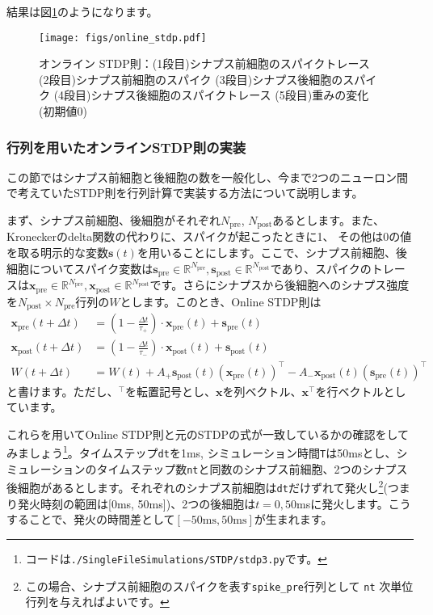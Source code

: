 結果は図\ref{fig:online_stdp}のようになります。
\begin{figure}[htbp]
    \centering
    \texttt{[image: figs/online\_stdp.pdf]}
    \caption{オンライン STDP則：(1段目)シナプス前細胞のスパイクトレース (2段目)シナプス前細胞のスパイク (3段目)シナプス後細胞のスパイク (4段目)シナプス後細胞のスパイクトレース (5段目)重みの変化(初期値0)}
    \label{fig:online_stdp}
\end{figure}
\subsubsection{行列を用いたオンラインSTDP則の実装}
この節ではシナプス前細胞と後細胞の数を一般化し、今まで2つのニューロン間で考えていたSTDP則を行列計算で実装する方法について説明します。\par
まず、シナプス前細胞、後細胞がそれぞれ$N_\text{pre}$, $N_\text{post}$あるとします。また、Kroneckerのdelta関数の代わりに、スパイクが起こったときに1、 その他は0の値を取る明示的な変数$\boldsymbol{s}(t)$を用いることにします。ここで、シナプス前細胞、後細胞についてスパイク変数は$\boldsymbol{s}_{\text{pre}} \in \mathbb{R}^{N_\text{pre}}, \boldsymbol{s}_{\text{post}} \in \mathbb{R}^{N_\text{post}}$であり、スパイクのトレースは$\boldsymbol{x}_{\text{pre}} \in \mathbb{R}^{N_\text{pre}}, \boldsymbol{x}_{\text{post}} \in \mathbb{R}^{N_\text{post}}$です。さらにシナプスから後細胞へのシナプス強度を$N_\text{post} \times N_\text{pre}$行列の$W$とします。このとき、Online STDP則は
\begin{align}
\boldsymbol{x}_{\text{pre}}(t+\Delta t)&=\left(1-\frac{\Delta t}{\tau_{+}}\right)\cdot \boldsymbol{x}_{\text{pre}}(t)+
\boldsymbol{s}_{\text{pre}}(t)\\
\boldsymbol{x}_{\text{post}}(t+\Delta t)&=\left(1-\frac{\Delta t}{\tau_{-}}\right)\cdot \boldsymbol{x}_{\text{post}}(t)+\boldsymbol{s}_{\text{post}}(t)\\
W(t+\Delta t)&=W(t)+A_+ \boldsymbol{s}_{\text{post}}(t)(\boldsymbol{x}_{\text{pre}}(t))^\intercal - A_-\boldsymbol{x}_{\text{post}}(t)(\boldsymbol{s}_{\text{pre}}(t))^\intercal
\end{align}
と書けます。ただし、$^\intercal$を転置記号とし、$\boldsymbol{x}$を列ベクトル、$\boldsymbol{x}^\intercal$を行ベクトルとしています。\par
これらを用いてOnline STDP則と元のSTDPの式が一致しているかの確認をしてみましょう\footnote{コードは\texttt{./SingleFileSimulations/STDP/stdp3.py}です。}。タイムステップ\texttt{dt}を1ms, シミュレーション時間\texttt{T}は50msとし、シミュレーションのタイムステップ数\texttt{nt}と同数のシナプス前細胞、2つのシナプス後細胞があるとします。それぞれのシナプス前細胞は\texttt{dt}だけずれて発火し\footnote{この場合、シナプス前細胞のスパイクを表す\texttt{spike\_pre}行列として \texttt{nt} 次単位行列を与えればよいです。}(つまり発火時刻の範囲は[0ms, 50ms])、2つの後細胞は$t=0, 50$msに発火します。こうすることで、発火の時間差として$[-50\text{ms}, 50\text{ms}]$が生まれます。
